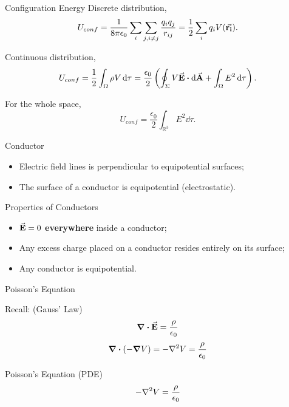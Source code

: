 \documentclass{beamer}
\begin{document}
\begin{frame}{Configuration Energy}
    Discrete distribution,
    \begin{equation}
        U_{conf} = \frac{1}{8 \pi \epsilon_0} \sum_{i} \sum_{j, i \neq j} \frac{q_i q_j}{r_{ij}} = \frac{1}{2} \sum_{i} q_i V(\va{r_i}).
    \end{equation}

    Continuous distribution,
    \begin{equation}
        U_{conf} = \frac{1}{2} \int_{\Omega} \rho V \dd{\tau} = \frac{\epsilon_0}{2} \left( \oint_{\Sigma} V \va{E} \vdot \dd{\va{A}} + \int_{\Omega} E^2 \dd{\tau} \right).
    \end{equation}

    For the whole space,
    \begin{equation}
        U_{conf} = \frac{\epsilon_0}{2} \int_{\mathbb{R}^3} E^2 \dd{\tau}.
    \end{equation}
\end{frame}


\begin{frame}{Conductor}
    \begin{itemize}
        \item Electric field lines is perpendicular to equipotential surfaces;
        \item The surface of a conductor is equipotential (electrostatic).
    \end{itemize}
    \vspace{1em}
    \begin{beamerboxesrounded}[shadow=true]{Properties of Conductors}
        \begin{itemize}
            \item $\va{E} = 0$ \textbf{everywhere} inside a conductor;
            \item Any excess charge placed on a conductor resides entirely on its surface;
            \item Any conductor is equipotential.
        \end{itemize}
    \end{beamerboxesrounded}
\end{frame}


\begin{frame}{Poisson's Equation}
    \begin{block}{Recall: (Gauss' Law)}
        \begin{equation}
            \div{\va{E}} = \frac{\rho}{\epsilon_0}
        \end{equation}  
        \begin{equation}
            \div(-\grad{V}) = -\laplacian{V} = \frac{\rho}{\epsilon_0}
        \end{equation}
    \end{block}

    \begin{block}{Poisson's Equation (PDE)}
        \begin{equation}
            - \laplacian{V} = \frac{\rho}{\epsilon_0}
        \end{equation}
    \end{block}
\end{frame}
\end{document}
